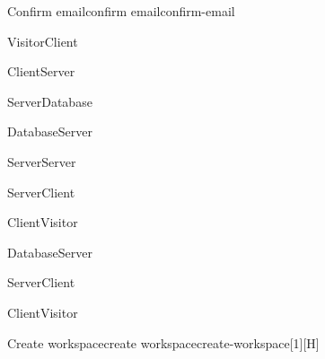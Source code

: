 \begin{toexclude}
\begin{sdfig}{Confirm email}{confirm email}{confirm-email}

  \begin{umlcall}[op={Confirm}]{Visitor}{Client}
    \begin{umlcall}[op={Confirm}]{Client}{Server}
      \begin{umlcall}[op={Has OTP}]{Server}{Database}
        \begin{umlfragment}[type=alt, label=true]
          \begin{umlcall}[type=return,op={Yes}]{Database}{Server}
            \begin{umlcall}[op={Add cookies}]{Server}{Server}
            \end{umlcall}
            \begin{umlcall}[type=return,op={Ok}]{Server}{Client}
              \begin{umlcall}[type=return,op={Ok}]{Client}{Visitor}
              \end{umlcall}
            \end{umlcall}
          \end{umlcall}
          \umlfpart[else]
          \begin{umlcall}[type=return,op={No}]{Database}{Server}
            \begin{umlcall}[type=return,op={Error}]{Server}{Client}
              \begin{umlcall}[type=return,op={Error}]{Client}{Visitor}
              \end{umlcall}
            \end{umlcall}
          \end{umlcall}
        \end{umlfragment}
      \end{umlcall}
    \end{umlcall}
  \end{umlcall}
\end{sdfig}


\begin{sdfig}{Create workspace}{create workspace}{create-workspace}[1][H]


\end{sdfig}
\end{toexclude}
